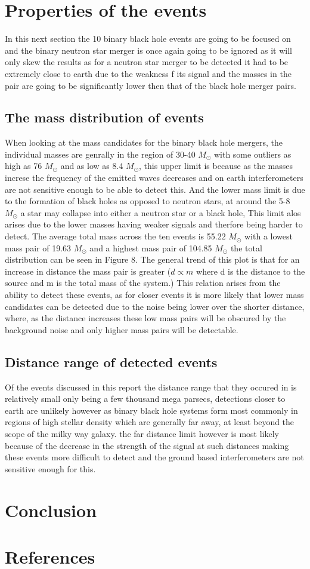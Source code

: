 \documentclass[]{article}
\begin{document}
\section*{Properties of the events}
In this next section the 10 binary black hole events are going to be focused on and the binary
neutron star merger is once again going to be ignored as
it will only skew the results as for a neutron star merger to be detected it had to be extremely
close to earth due to the weakness f its signal and the masses in the pair are going to be
significantly lower then that of the black hole merger pairs.
\subsection*{The mass distribution of events}
When looking at the mass candidates for the binary black hole mergers, the individual masses are genrally in the region of
30-40 $M_{\odot}$ with some outliers as high as 76 $M_{\odot}$ and as low as 8.4 $M_{\odot}$, this upper limit is because as the masses increse the frequency of the emitted waves
decreases and on earth interferometers are not sensitive enough to be able to detect this. And the lower mass limit is due to the
formation of black holes as opposed to neutron stars, at around the 5-8 $M_{\odot}$ a star may collapse into either a neutron star or a black hole,
This limit alos arises due to the lower masses having weaker signals and therfore being harder to detect. The average total mass across
the ten events is 55.22 $M_{\odot}$ with a lowest mass pair of 19.63 $M_{\odot}$ and a highest
mass pair of 104.85 $M_{\odot} $ the total distribution can be seen in Figure 8.
The general trend of this plot is that for an increase in distance the mass pair is greater ($d \propto m $ where d is the distance to the source and m is the total mass of the system.)
This relation arises from the ability to detect these events, as for closer events it is more likely that lower mass candidates can be
detected due to the noise being lower over the shorter distance, where, as the distance increases these low mass pairs will be obscured by the background noise and only higher
mass pairs will be detectable.
\subsection*{Distance range of detected events}
Of the events discussed in this report the distance range that they occured in is relatively small only being a few thousand mega parsecs, detections closer to earth are unlikely however
as binary black hole systems form most commonly in regions of high stellar density which are generally far away, at least beyond the scope of the milky way galaxy.
the far distance limit however is most likely because of the decrease in the strength of the signal at such distances making these events more difficult to detect and the ground based interferometers
are not sensitive enough for this.

\section*{Conclusion}

\section*{References}
\end{document}
